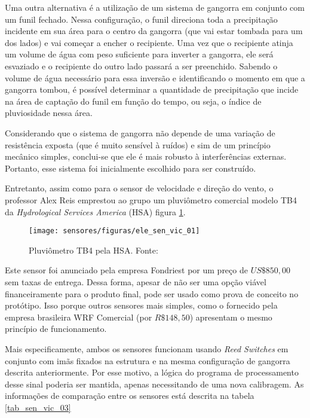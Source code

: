 			Uma outra alternativa é a utilização de um sistema de gangorra em conjunto com um funil fechado. Nessa configuração, o funil direciona toda a precipitação incidente em sua área para o centro da gangorra (que vai estar tombada para um dos lados) e vai começar a encher o recipiente. Uma vez que o recipiente atinja um volume de água com peso suficiente para inverter a gangorra, ele será esvaziado e o recipiente do outro lado passará a ser preenchido. Sabendo o volume de água necessário para essa inversão e identificando o momento em que a gangorra tombou, é possível determinar a quantidade de precipitação que incide na área de captação do funil em função do tempo, ou seja, o índice de pluviosidade nessa área.

			Considerando que o sistema de gangorra não depende de uma variação de resistência exposta (que é muito sensível à ruídos) e sim de um princípio mecânico simples, conclui-se que ele é mais robusto à interferências externas. Portanto, esse sistema foi inicialmente escolhido para ser construído.
			
			Entretanto, assim como para o sensor de velocidade e direção do vento, o professor Alex Reis emprestou ao grupo um pluviômetro comercial modelo TB4 da \emph{Hydrological Services America} (HSA) figura \ref{ele_sen_vic_01}.
			
			\begin{figure}[H]
				\centering
				\texttt{[image: sensores/figuras/ele\_sen\_vic\_01]}
				\caption{Pluviômetro TB4 pela HSA. Fonte: \cite{bib_sen_vic_01}}
				\label{ele_sen_vic_01}
			\end{figure}

			Este sensor foi anunciado pela empresa Fondriest por um preço de $US\$ 850,00$ sem taxas de entrega. Dessa forma, apesar de não ser uma opção viável financeiramente para o produto final, pode ser usado como prova de conceito no protótipo. Isso porque outros sensores mais simples, como o fornecido pela empresa brasileira WRF Comercial (por $R\$ 148,50$) apresentam o mesmo princípio de funcionamento. 

			Mais especificamente, ambos os sensores funcionam usando \emph{Reed Switches} em conjunto com imãs fixados na estrutura e na mesma configuração de gangorra descrita anteriormente. Por esse motivo, a lógica do programa de processamento desse sinal poderia ser mantida, apenas necessitando de uma nova calibragem. As informações de comparação entre os sensores está descrita na tabela \ref{tab_sen_vic_03}

